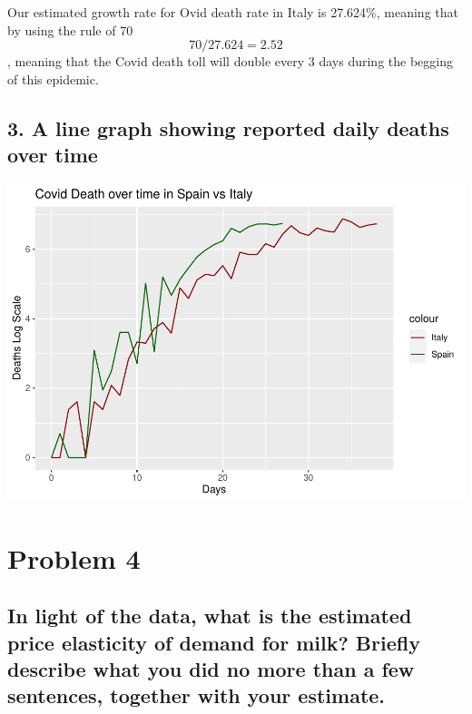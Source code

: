 \documentclass[
]{article}
\begin{document}
Our estimated growth rate for Ovid death rate in Italy is 27.624\%,
meaning that by using the rule of 70 \[ 70/27.624 = 2.52\], meaning that
the Covid death toll will double every 3 days during the begging of this
epidemic.

\hypertarget{a-line-graph-showing-reported-daily-deaths-over-time}{%
\subsection{3. A line graph showing reported daily deaths over
time}\label{a-line-graph-showing-reported-daily-deaths-over-time}}

\includegraphics{HW3_files/figure-latex/unnamed-chunk-8-1.pdf}

\hypertarget{problem-4}{%
\section{Problem 4}\label{problem-4}}

\hypertarget{in-light-of-the-data-what-is-the-estimated-price-elasticity-of-demand-for-milk-briefly-describe-what-you-did-no-more-than-a-few-sentences-together-with-your-estimate.}{%
\subsection{In light of the data, what is the estimated price elasticity
of demand for milk? Briefly describe what you did no more than a few
sentences, together with your
estimate.}\label{in-light-of-the-data-what-is-the-estimated-price-elasticity-of-demand-for-milk-briefly-describe-what-you-did-no-more-than-a-few-sentences-together-with-your-estimate.}}
\end{document}
